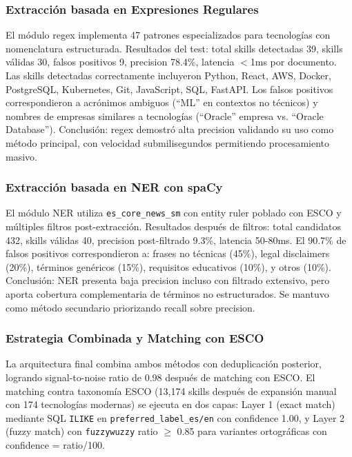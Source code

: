\subsubsection{Extracción basada en Expresiones Regulares}

El módulo regex implementa 47 patrones especializados para tecnologías con nomenclatura estructurada. Resultados del test: total skills detectadas 39, skills válidas 30, falsos positivos 9, precision 78.4\%, latencia $<$1ms por documento. Las skills detectadas correctamente incluyeron Python, React, AWS, Docker, PostgreSQL, Kubernetes, Git, JavaScript, SQL, FastAPI. Los falsos positivos correspondieron a acrónimos ambiguos (``ML'' en contextos no técnicos) y nombres de empresas similares a tecnologías (``Oracle'' empresa vs. ``Oracle Database''). Conclusión: regex demostró alta precision validando su uso como método principal, con velocidad submilisegundos permitiendo procesamiento masivo.

\subsubsection{Extracción basada en NER con spaCy}

El módulo NER utiliza \texttt{es\_core\_news\_sm} con entity ruler poblado con ESCO y múltiples filtros post-extracción. Resultados después de filtros: total candidatos 432, skills válidas 40, precision post-filtrado 9.3\%, latencia 50-80ms. El 90.7\% de falsos positivos correspondieron a: frases no técnicas (45\%), legal disclaimers (20\%), términos genéricos (15\%), requisitos educativos (10\%), y otros (10\%). Conclusión: NER presenta baja precision incluso con filtrado extensivo, pero aporta cobertura complementaria de términos no estructurados. Se mantuvo como método secundario priorizando recall sobre precision.

\subsubsection{Estrategia Combinada y Matching con ESCO}

La arquitectura final combina ambos métodos con deduplicación posterior, logrando signal-to-noise ratio de 0.98 después de matching con ESCO. El matching contra taxonomía ESCO (13,174 skills después de expansión manual con 174 tecnologías modernas) se ejecuta en dos capas: Layer 1 (exact match) mediante SQL \texttt{ILIKE} en \texttt{preferred\_label\_es/en} con confidence 1.00, y Layer 2 (fuzzy match) con \texttt{fuzzywuzzy} ratio $\geq$ 0.85 para variantes ortográficas con confidence = ratio/100.

